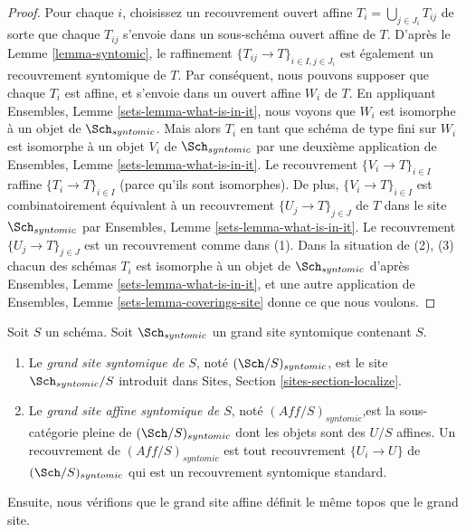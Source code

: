 \begin{proof}
Pour chaque $i$, choisissez un recouvrement ouvert affine $T_i = \bigcup_{j \in J_i} T_{ij}$ de sorte que chaque $T_{ij}$ s'envoie dans un sous-schéma ouvert affine de $T$. D'après le Lemme \ref{lemma-syntomic}, le raffinement $\{T_{ij} \to T\}_{i \in I, j \in J_i}$ est également un recouvrement syntomique de $T$. Par conséquent, nous pouvons supposer que chaque $T_i$ est affine, et s'envoie dans un ouvert affine $W_i$ de $T$. En appliquant Ensembles, Lemme \ref{sets-lemma-what-is-in-it}, nous voyons que $W_i$ est isomorphe à un objet de $\Sch_{syntomic}$. Mais alors $T_i$ en tant que schéma de type fini sur $W_i$ est isomorphe à un objet $V_i$ de $\Sch_{syntomic}$ par une deuxième application de Ensembles, Lemme \ref{sets-lemma-what-is-in-it}. Le recouvrement $\{V_i \to T\}_{i \in I}$ raffine $\{T_i \to T\}_{i \in I}$ (parce qu'ils sont isomorphes). De plus, $\{V_i \to T\}_{i \in I}$ est combinatoirement équivalent à un recouvrement $\{U_j \to T\}_{j \in J}$ de $T$ dans le site $\Sch_{syntomic}$ par Ensembles, Lemme \ref{sets-lemma-what-is-in-it}. Le recouvrement $\{U_j \to T\}_{j \in J}$ est un recouvrement comme dans (1). Dans la situation de (2), (3) chacun des schémas $T_i$ est isomorphe à un objet de $\Sch_{syntomic}$ d'après Ensembles, Lemme \ref{sets-lemma-what-is-in-it}, et une autre application de Ensembles, Lemme \ref{sets-lemma-coverings-site} donne ce que nous voulons.
\end{proof}


\begin{definition}
\label{definition-big-small-syntomic}
Soit $S$ un schéma. Soit $\Sch_{syntomic}$ un grand site syntomique contenant $S$.
\begin{enumerate}
\item Le {\it grand site syntomique de $S$}, noté $(\Sch/S)_{syntomic}$, est le site $\Sch_{syntomic}/S$ introduit dans Sites, Section \ref{sites-section-localize}.
\item Le {\it grand site affine syntomique de $S$}, noté $(\textit{Aff}/S)_{syntomic}$,\newline est la sous-catégorie pleine de $(\Sch/S)_{syntomic}$ dont les objets sont des $U/S$ affines. Un recouvrement de $(\textit{Aff}/S)_{syntomic}$ est tout recouvrement $\{U_i \to U\}$ de $(\Sch/S)_{syntomic}$ qui est un recouvrement syntomique standard.
\end{enumerate}
\end{definition}

\noindent
Ensuite, nous vérifions que le grand site affine définit le même topos que le grand site.

